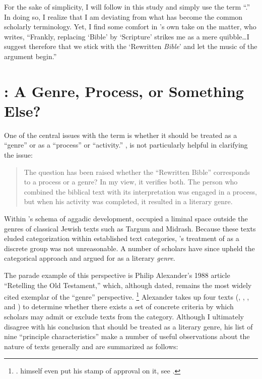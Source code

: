For the sake of simplicity, I will follow \vermes in this study and simply use the term ``\rwb.'' In doing so, I realize that I am deviating from what has become the common scholarly terminology. Yet, I find some comfort in \vermes's own take on the matter, who writes, ``Frankly, replacing `Bible' by `Scripture' strikes me as a mere quibble\ldots{}I suggest therefore that we stick with the `Rewritten \emph{Bible}' and let the music of the argument begin.''%
    \autocite[original emphasis]{vermes_zsengeller2014} 

\section{\rwb: A Genre, Process, or Something Else?}

 One of the central issues with the term \rwb is whether it should be treated as a ``genre'' or as a ``process'' or ``activity.'' \vermes, is not particularly helpful in clarifying the issue: 

\begin{quote}
    The question has been raised whether the ``Rewritten Bible'' corresponds to a process or a genre? In my view, it verifies both. The person who combined the biblical text with its interpretation was engaged in a process, but when his activity was completed, it resulted in a literary genre.%
    \autocite[8]{vermes_zsengeller2014}
\end{quote} 
\noindent
Within \vermes's schema of aggadic development, \rwb occupied a liminal space outside the genres of classical Jewish texts such as Targum and Midrash. Because these texts eluded categorization within established text categories, \vermes's treatment of \rwb as a discrete group was not unreasonable. A number of scholars have since upheld the categorical approach and argued for \rwb as a literary \emph{genre}. 

The parade example of this perspective is Philip Alexander's 1988 article ``Retelling the Old Testament,'' which, although dated, remains the most widely cited exemplar of the ``genre'' perspective.%
    \footnote{%
        \Cite{alexander_carson-williamson1988}.
        \vermes himself even put his stamp of approval on it, see
        \cite[4]{vermes_zsengeller2014}.}
Alexander takes up four \rwb texts (\jub, \ga, \lab, and \ant) to determine whether there exists a set of concrete criteria by which scholars may admit or exclude texts from the category. Although I ultimately disagree with his conclusion that \rwb should be treated as a literary genre, his list of nine ``principle characteristics'' make a number of useful observations about the nature of \rwb texts generally and are summarized as follows: 

